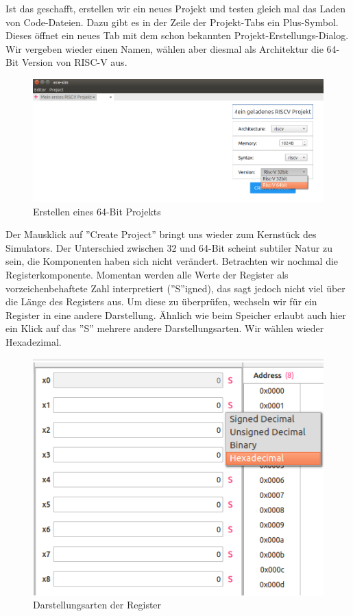 Ist das geschafft, erstellen wir ein neues Projekt und testen gleich mal das
Laden von Code-Dateien. Dazu gibt es in der Zeile der Projekt-Tabs ein
Plus-Symbol. Dieses öffnet ein neues Tab mit dem schon bekannten
Projekt-Erstellungs-Dialog. Wir vergeben wieder einen Namen, wählen aber diesmal
als Architektur die 64-Bit Version von RISC-V aus.
\begin{figure}[H]
	\centering
	\includegraphics[scale=0.65]{Images/first-steps-8.png}
	\caption{Erstellen eines 64-Bit Projekts}
\end{figure}

Der Mausklick auf ''Create Project'' bringt uns wieder zum Kernstück des
Simulators. Der Unterschied zwischen 32 und 64-Bit scheint subtiler Natur zu
sein, die Komponenten haben sich nicht verändert.  Betrachten wir nochmal die
Registerkomponente. Momentan werden alle Werte der Register als
vorzeichenbehaftete Zahl interpretiert (''S''igned), das sagt jedoch nicht viel
über die Länge des Registers aus. Um diese zu überprüfen, wechseln wir für ein
Register in eine andere Darstellung. Ähnlich wie beim Speicher erlaubt auch hier
ein Klick auf das ''S'' mehrere andere Darstellungsarten. Wir wählen wieder
Hexadezimal.
\begin{figure}[H]
	\centering
	\includegraphics[scale=1.0]{Images/first-steps-9.png}
	\caption{Darstellungsarten der Register}
\end{figure}


